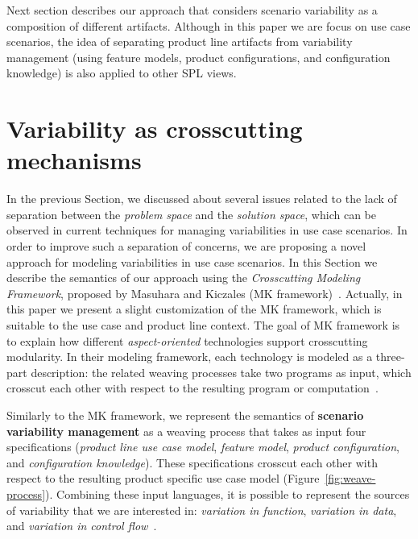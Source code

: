 \documentclass{acm_proc_article-sp}
\begin{document}
Next section describes our approach that considers scenario variability as a
composition of different artifacts. Although in this paper we are focus on use
case scenarios, the idea of separating product line artifacts from variability
management (using feature models, product configurations, and configuration
knowledge) is also applied to other SPL views.


\section{Variability as crosscutting mechanisms}
\label{sec:models}

In the previous Section, we discussed about several issues related to the lack of
separation between the \emph{problem space} and the \emph{solution space}, which
can be observed in current techniques for managing variabilities in use case
scenarios. In order to improve such a separation of concerns, we are proposing a
novel approach for modeling variabilities in use case scenarios. In this Section
we describe the semantics of our approach using the \emph{Crosscutting Modeling
Framework}, proposed by Masuhara and Kiczales (MK
framework)~\cite{Masuhara:2003aa}. Actually, in this paper we present a slight
customization of the MK framework, which is suitable to the use case and product
line context. The goal of MK framework is to explain how different
\emph{aspect-oriented} technologies support crosscutting modularity. In their
modeling framework, each technology is modeled as a three-part description: the
related weaving processes take two programs as input, which crosscut each other
with respect to the resulting program or computation~\cite{Masuhara:2003aa}.

Similarly to the MK framework, we represent the semantics of \textbf{scenario
variability management} as a weaving process that takes as input four
specifications (\emph{product line use case model}, \emph{feature model}, \emph{product
configuration}, and \emph{configuration knowledge}). These
specifications crosscut each other with respect to the resulting product
specific use case model (Figure~\ref{fig:weave-process}). 
Combining these input languages, it is possible
to represent the sources of variability that we are interested in:
\emph{variation in function}, \emph{variation in data}, and
\emph{variation in control flow}~\cite{Bachmann:2001aa}.
\end{document}
